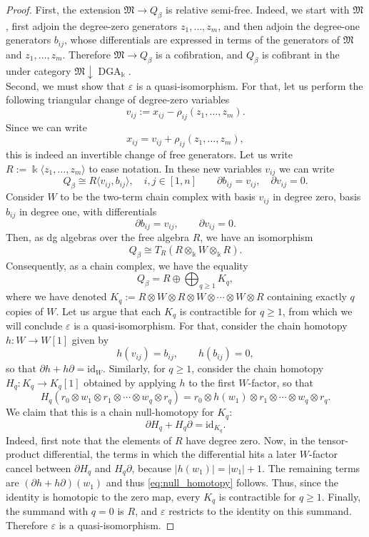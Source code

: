 \documentclass[11pt]{article}
\newcommand{\kk}{\Bbbk}
\newcommand{\FM}{\mathfrak M}
\newcommand{\id}{\mathrm{id}}
\newcommand{\DGA}{\operatorname{DGA}_{\kk}}
\begin{document}
\begin{proof}
First, the extension \(\FM\to Q_\beta\) is relative semi-free.  Indeed,
we start with \(\FM\), first adjoin the degree-zero generators
\(z_1,\ldots,z_m\), and then adjoin the degree-one generators \(b_{ij}\),
whose differentials are expressed in terms of the generators of $\FM$ and \(z_1,\ldots,z_m\). Therefore
\(\FM\to Q_\beta\) is a cofibration, and \(Q_\beta\) is cofibrant in the
under category \(\FM\!\downarrow\!\DGA\).\\

\noindent Second, we must show that \(\varepsilon\) is a quasi-isomorphism. For that, let us perform the following triangular change of degree-zero variables
\[
 v_{ij}:=x_{ij}-\rho_{ij}(z_1,\ldots,z_m).
\]
Since we can write
\[
 x_{ij}=v_{ij}+\rho_{ij}(z_1,\ldots,z_m),
\]
this is indeed an invertible change of free generators. Let us write $R:=\kk\langle z_1,\ldots,z_m\rangle$ to ease notation. In these new variables $v_{ij}$ we can write
\[
 Q_\beta\cong R\langle v_{ij},b_{ij}\rangle,\quad i,j\in[1,n]
 \qquad
 \partial b_{ij}=v_{ij},
 \quad
 \partial v_{ij}=0.
\]
\noindent Consider \(W\) to be the two-term chain complex with basis \(v_{ij}\) in degree zero, basis
\(b_{ij}\) in degree one, with differentials
\[
 \partial b_{ij}=v_{ij},
 \qquad
 \partial v_{ij}=0.
\]
Then, as dg algebras over the free algebra \(R\), we have an isomorphism
\[
 Q_\beta\cong T_R(R\otimes_{\kk}W\otimes_{\kk}R).
\]
Consequently, as a chain complex, we have the equality
\[
 Q_\beta=R\oplus\bigoplus_{q\geq1}K_q,
\]
where we have denoted $K_q:=
 R\otimes W\otimes R\otimes W\otimes\cdots\otimes W\otimes R$ containing exactly \(q\) copies of \(W\). Let us argue that each $K_q$ is contractible for $q\geq1$, from which we will conclude $\varepsilon$ is a quasi-isomorphism. For that, consider the chain homotopy \(h:W\to W[1]\) given by
\[
 h(v_{ij})=b_{ij},
 \qquad
 h(b_{ij})=0,
\]
so that $\partial h+h\partial=\id_W$. Similarly, for \(q\geq1\), consider the chain homotopy \(H_q:K_q\to K_q[1]\) obtained by applying \(h\) to the
first \(W\)-factor, so that
\[
 H_q(r_0\otimes w_1\otimes r_1\otimes\cdots\otimes w_q\otimes r_q)
 =r_0\otimes h(w_1)\otimes r_1\otimes\cdots\otimes w_q\otimes r_q.
\]
We claim that this is a chain null-homotopy for $K_q$:
\begin{equation}\label{eq:null_homotopy}
 \partial H_q+H_q\partial=\id_{K_q}.   
\end{equation}
Indeed, first note that the elements of \(R\) have degree zero. Now, in the tensor-product
differential, the terms in which the differential hits a later
\(W\)-factor cancel between \(\partial H_q\) and \(H_q\partial\), because
\(|h(w_1)|=|w_1|+1\). The remaining terms are
\((\partial h+h\partial)(w_1)\) and thus \eqref{eq:null_homotopy} follows. Thus, since the identity is homotopic to the zero map, every \(K_q\) is contractible for \(q\geq1\). Finally, the summand with
\(q=0\) is \(R\), and \(\varepsilon\) restricts to the identity on this
summand.  Therefore \(\varepsilon\) is a quasi-isomorphism.
\end{proof}
\end{document}
